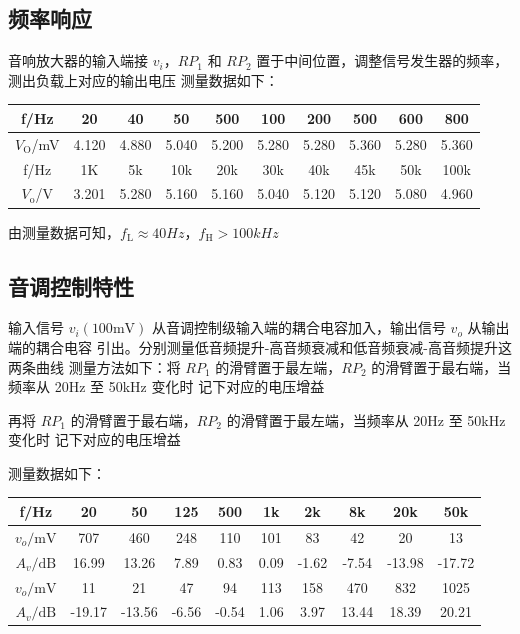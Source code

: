 \documentclass[a4paper,11pt,UTF8]{article}
\numberwithin{equation}{subsection}
\begin{document}
\subsection{频率响应}
音响放大器的输入端接 $v_i$，$RP_1$ 和 $RP_2$ 置于中间位置，调整信号发生器的频率，测出负载上对应的输出电压
测量数据如下：

\begin{table}[H]
	\centering
	\begin{tabular}{|c|c|c|c|c|c|c|c|c|c|}
		\hline
		f/Hz& 20 & 40&50&500&100&200&500&600&800\\
		\hline
		$V_\mathrm{O}$/mV& 4.120 & 4.880&5.040&5.200&5.280&5.280&5.360&5.280&5.360\\
		\hline
		f/Hz& 1K& 5k&10k&20k&30k&40k&45k&50k&100k\\
		\hline
		$V_\mathrm{o}$/V& 3.201 & 5.280&5.160&5.160&5.040&5.120&5.120&5.080&4.960\\
		\hline
	\end{tabular}
\end{table}

由测量数据可知，$f_\mathrm{L}\approx{40Hz}$，$f_\mathrm{H}>{100kHz}$

\subsection{音调控制特性}
输入信号 $v_i(100\text{mV})$ 从音调控制级输入端的耦合电容加入，输出信号 $v_o$ 从输出端的耦合电容
引出。分别测量低音频提升-高音频衰减和低音频衰减-高音频提升这两条曲线
测量方法如下：将 $RP_1$ 的滑臂置于最左端，$RP_2$ 的滑臂置于最右端，当频率从 20Hz 至 50kHz 变化时
记下对应的电压增益

再将 $RP_1$ 的滑臂置于最右端，$RP_2$ 的滑臂置于最左端，当频率从 20Hz 至 50kHz 变化时
记下对应的电压增益

测量数据如下：

\begin{table}
	\centering
	\begin{tabular}{|c|c|c|c|c|c|c|c|c|c|}
		\hline
		f/Hz & 20 & 50 & 125 & 500&1k&2k&8k&20k&50k \\
		\hline
		$v_o/\text{mV}$&707&460&248&110&101&83&42&20&13 \\
		\hline
		$A_v/\text{dB}$&16.99&13.26&7.89&0.83&0.09&-1.62&-7.54&-13.98&-17.72\\
		\hline
		$v_o/\text{mV}$&11&21&47&94&113&158&470&832&1025 \\
		\hline
		$A_v/\text{dB}$&-19.17&-13.56&-6.56&-0.54&1.06&3.97&13.44&18.39&20.21\\
		\hline
	\end{tabular}
\end{table}
\end{document}
